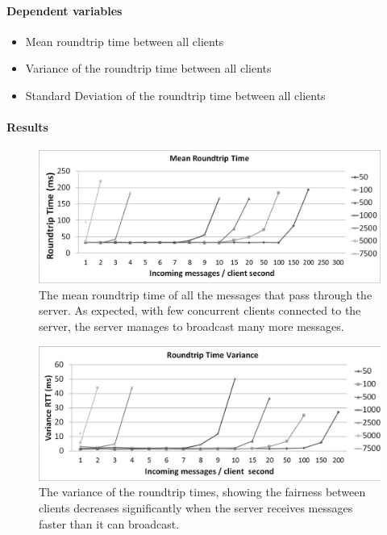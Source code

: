 \documentclass[12pt]{article}
\begin{document}
\paragraph{Dependent variables}
\begin{itemize}
\item Mean roundtrip time between all clients
\item Variance of the roundtrip time between all clients
\item Standard Deviation of the roundtrip time between all clients
\end{itemize}

\paragraph{Results}
\begin{center}

\begin{figure}[h]
\includegraphics[scale=0.32]{test_SERVER_RTTmean.jpg}
\caption{The mean roundtrip time of all the messages that pass through the server. As expected, with few concurrent clients connected to the server, the server manages to broadcast many more messages.}
\end{figure}


\begin{figure}
\includegraphics[scale=0.32]{test_SERVER_RTTvariance.jpg}
\caption{The variance of the roundtrip times, showing the fairness between clients decreases significantly when the server receives messages faster than it can broadcast.}
\end{figure}



\end{center}
\end{document}
